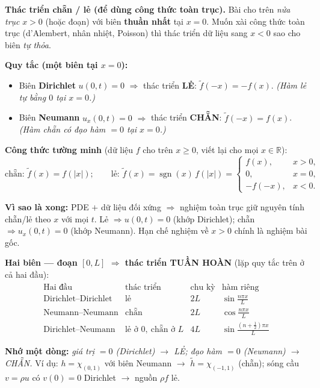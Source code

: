 \textbf{Thác triển chẵn / lẻ (để dùng công thức toàn trục).}
Bài cho trên \emph{nửa trục} $x>0$ (hoặc đoạn) với biên \textbf{thuần nhất} tại $x=0$. Muốn xài công thức toàn trục
(d'Alembert, nhân nhiệt, Poisson) thì thác triển dữ liệu sang $x<0$ sao cho biên \emph{tự thỏa}.

\smallskip
\textbf{Quy tắc (một biên tại $x=0$):}
\begin{itemize}
\item Biên \textbf{Dirichlet} $u(0,t)=0$ $\Rightarrow$ thác triển \textbf{LẺ}: $\tilde f(-x)=-f(x)$. \emph{(Hàm lẻ tự bằng $0$ tại $x=0$.)}
\item Biên \textbf{Neumann} $u_x(0,t)=0$ $\Rightarrow$ thác triển \textbf{CHẴN}: $\tilde f(-x)=f(x)$. \emph{(Hàm chẵn có đạo hàm $=0$ tại $x=0$.)}
\end{itemize}

\textbf{Công thức tường minh} (dữ liệu $f$ cho trên $x\ge0$, viết lại cho mọi $x\in\mathbb{R}$):
\[
  \text{chẵn: } \tilde f(x)=f(|x|);\qquad
  \text{lẻ: } \tilde f(x)=\operatorname{sgn}(x)\,f(|x|)=
  \begin{cases} f(x), & x>0,\\ 0, & x=0,\\ -f(-x), & x<0.\end{cases}
\]

\textbf{Vì sao là xong:} PDE $+$ dữ liệu đối xứng $\Rightarrow$ nghiệm toàn trục giữ nguyên tính chẵn/lẻ theo $x$ với mọi $t$.
Lẻ $\Rightarrow u(0,t)=0$ (khớp Dirichlet); chẵn $\Rightarrow u_x(0,t)=0$ (khớp Neumann). Hạn chế nghiệm về $x>0$ chính là nghiệm bài gốc.

\smallskip
\textbf{Hai biên --- đoạn $[0,L]$ $\Rightarrow$ thác triển TUẦN HOÀN} (lặp quy tắc trên ở cả hai đầu):
\[
  \begin{array}{l|c|c|c}
   \text{Hai đầu} & \text{thác triển} & \text{chu kỳ} & \text{hàm riêng}\\\hline
   \text{Dirichlet--Dirichlet} & \text{lẻ} & 2L & \sin\frac{n\pi x}{L}\\
   \text{Neumann--Neumann} & \text{chẵn} & 2L & \cos\frac{n\pi x}{L}\\
   \text{Dirichlet--Neumann} & \text{lẻ ở }0,\ \text{chẵn ở }L & 4L & \sin\frac{(n+\frac12)\pi x}{L}
  \end{array}
\]

\textbf{Nhớ một dòng:} \emph{giá trị $=0$ (Dirichlet) $\to$ LẺ; đạo hàm $=0$ (Neumann) $\to$ CHẴN.}
Ví dụ: $h=\chi_{(0,1)}$ với biên Neumann $\to$ $\tilde h=\chi_{(-1,1)}$ (chẵn); sóng cầu $v=\rho u$ có $v(0)=0$ Dirichlet $\to$ nguồn $\rho f$ lẻ.
